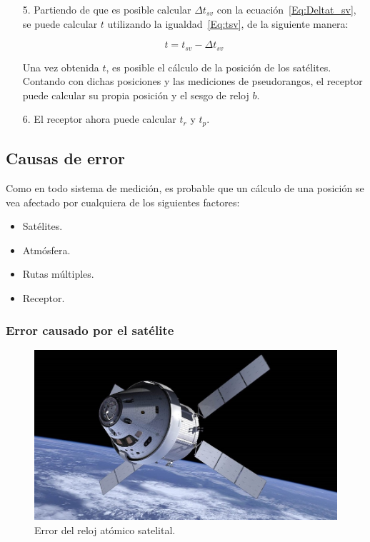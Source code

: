 {\begin{itemize}
y $\Delta n$ es una constante dada por la observación.\\

\item[5.] Partiendo de que es posible calcular $\Delta t_{sv}$ con la ecuación~\ref{Eq:Deltat_sv}, se puede calcular $t$ utilizando la igualdad~\ref{Eq:tsv}, de la siguiente manera:

\begin{equation}
\label{t}
t = t_{sv} - \Delta t_{sv}
\end{equation}

Una vez obtenida $t$, es posible el cálculo de la posición de los satélites. Contando con dichas posiciones y las mediciones de pseudorangos, el receptor puede calcular su propia posición y el sesgo de reloj $b$.

\item[6.] El receptor ahora puede calcular $t_r$ y $t_p$.
\end{itemize}
}
\subsection{Causas de error}

Como en todo sistema de medición, es probable que un cálculo de una posición se vea afectado por cualquiera de los siguientes factores: 

\begin{itemize}
	\item Satélites.
	\item Atmósfera.
	\item Rutas múltiples.
	\item Receptor.
\end{itemize} 

\subsubsection{Error causado por el satélite}

\begin{figure}[H]
\centering
\includegraphics[scale=0.41]{Figures/Sat}
\caption[Error del reloj atómico satelital.]{Error del reloj atómico satelital\footnotemark.}
\label{fig:ErrSat}
\end{figure}

